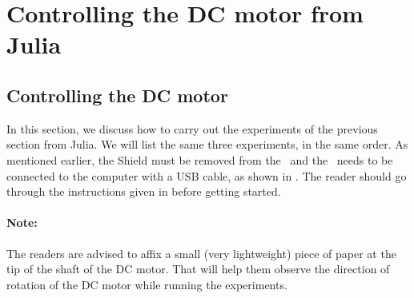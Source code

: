 \section{Controlling the DC motor from Julia}
\subsection{Controlling the DC motor}
In this section, we discuss how to carry out the experiments of the
previous section from Julia.  We will list the same three experiments,
in the same order. As mentioned earlier, the Shield must be removed from 
the \arduino\ and the \arduino\ needs to be connected to the computer 
with a USB cable, as shown in . The reader should go through the instructions given in  before getting started.

\paragraph{Note:} The readers are advised to affix a small 
(very lightweight) piece of paper at the tip of the shaft of the DC motor. 
That will help them observe the direction of rotation 
of the DC motor while running the experiments.

